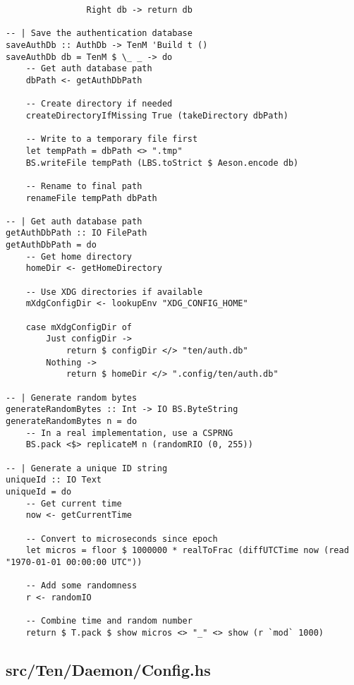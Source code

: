 \documentclass{article}
\begin{document}
\begin{tcolorbox}[title=Ten/Daemon/Auth.hs Changes]
\begin{verbatim}
                Right db -> return db

-- | Save the authentication database
saveAuthDb :: AuthDb -> TenM 'Build t ()
saveAuthDb db = TenM $ \_ _ -> do
    -- Get auth database path
    dbPath <- getAuthDbPath

    -- Create directory if needed
    createDirectoryIfMissing True (takeDirectory dbPath)

    -- Write to a temporary file first
    let tempPath = dbPath <> ".tmp"
    BS.writeFile tempPath (LBS.toStrict $ Aeson.encode db)

    -- Rename to final path
    renameFile tempPath dbPath

-- | Get auth database path
getAuthDbPath :: IO FilePath
getAuthDbPath = do
    -- Get home directory
    homeDir <- getHomeDirectory

    -- Use XDG directories if available
    mXdgConfigDir <- lookupEnv "XDG_CONFIG_HOME"

    case mXdgConfigDir of
        Just configDir ->
            return $ configDir </> "ten/auth.db"
        Nothing ->
            return $ homeDir </> ".config/ten/auth.db"

-- | Generate random bytes
generateRandomBytes :: Int -> IO BS.ByteString
generateRandomBytes n = do
    -- In a real implementation, use a CSPRNG
    BS.pack <$> replicateM n (randomRIO (0, 255))

-- | Generate a unique ID string
uniqueId :: IO Text
uniqueId = do
    -- Get current time
    now <- getCurrentTime

    -- Convert to microseconds since epoch
    let micros = floor $ 1000000 * realToFrac (diffUTCTime now (read "1970-01-01 00:00:00 UTC"))

    -- Add some randomness
    r <- randomIO

    -- Combine time and random number
    return $ T.pack $ show micros <> "_" <> show (r `mod` 1000)
\end{verbatim}
\end{tcolorbox}

\subsection{src/Ten/Daemon/Config.hs}
\end{document}
